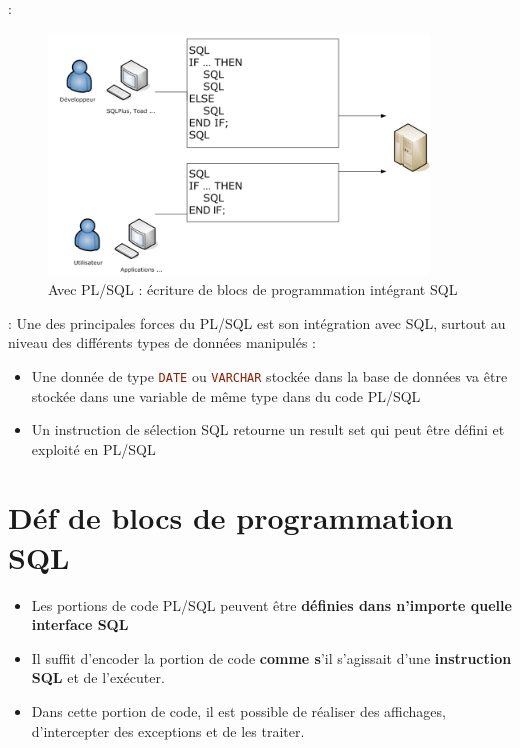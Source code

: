 \documentclass[10pt]{beamer}
\begin{document}
\begin{frame}{\secname : \subsecname}
    \begin{figure}
        \begin{center}
            \includegraphics[width=0.9\textwidth]{../assets/img/envoi_instruction-2.png}
            \caption{Avec PL/SQL : écriture de blocs de programmation intégrant SQL}
        \end{center}
    \end{figure}
\end{frame}

\begin{frame}{\secname : \subsecname}
    Une des principales forces du PL/SQL est son intégration avec SQL, surtout au niveau des différents types de données manipulés :
    \begin{itemize}
        \item Une donnée de type \lstinline[language=sql]!DATE! ou \lstinline[language=sql]!VARCHAR! stockée dans la base de données va être stockée dans une variable de même type dans du code PL/SQL
        \item Un instruction de sélection SQL retourne un result set qui peut être défini et exploité en PL/SQL
    \end{itemize}
\end{frame}
\section{Déf de blocs de programmation SQL}
\begin{frame}{\secname}
    \begin{itemize}
        \item Les portions de code PL/SQL peuvent être \textbf{définies dans n'importe quelle interface SQL}
        \item Il suffit d'encoder la portion de code \textbf{comme s}'il s'agissait d'une \textbf{instruction SQL} et de l'exécuter.
        \item Dans cette portion de code, il est possible de réaliser des affichages, d'intercepter des exceptions et de les traiter.
    \end{itemize}
\end{frame}
\end{document}
